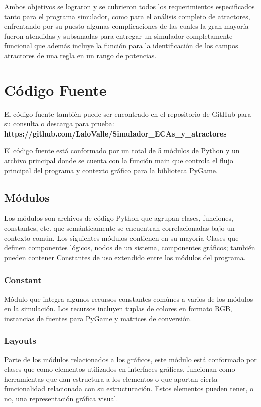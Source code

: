 \documentclass[]{article}
\begin{document}
		\hfill\break
		\justifying
		Ambos objetivos se lograron y se cubrieron todos los requerimientos especificados tanto para el programa simulador, como para el análisis completo de atractores, enfrentando por su puesto algunas complicaciones de las cuales la gran mayoría fueron atendidas y subsanadas para entregar un simulador completamente funcional que además incluye la función para la identificación de los campos atractores de una regla en un rango de potencias.
	
	\section{Código Fuente}
		El código fuente también puede ser encontrado en el repositorio de GitHub para su consulta o descarga para prueba:
		\textbf{https://github.com/LaloValle/Simulador\_ECAs\_y\_atractores}
		
		El código fuente está conformado por un total de 5 módulos de Python y un archivo principal donde se cuenta con la función main que controla el flujo principal del programa y contexto gráfico para la biblioteca PyGame.
		
		\subsection{Módulos}
			Los módulos son archivos de código Python que agrupan clases, funciones, constantes, etc. que semánticamente se encuentran correlacionadas bajo un contexto común. Los siguientes módulos contienen en su mayoría Clases que definen componentes lógicos, nodos de un sistema, componentes gráficos; también pueden contener Constantes de uso extendido entre los módulos del programa.
			
		\subsubsection{Constant}
			Módulo que integra algunos recursos constantes comúnes a varios de los módulos en la simulación. Los recursos incluyen tuplas de colores en formato RGB, instancias de fuentes para PyGame y matrices de conversión.
			
		
		\subsubsection{Layouts}
			Parte de los módulos relacionados a los gráficos, este módulo está conformado por clases que como elementos utilizados en interfaces gráficas, funcionan como herramientas que dan estructura a los elementos o que aportan cierta funcionalidad relacionada con su estructuración. Estos elementos pueden tener, o no, una representación gráfica visual.
			
\end{document}
